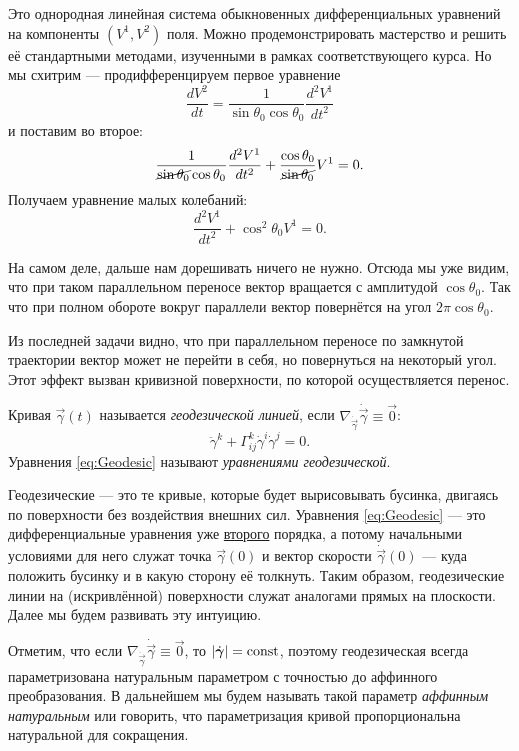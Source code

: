 \begin{solution}
	Это однородная линейная система обыкновенных дифференциальных уравнений на компоненты $(V^1, V^2)$ поля. Можно продемонстрировать мастерство и решить её стандартными методами, изученными в рамках соответствующего курса. Но мы схитрим --- продифференцируем первое уравнение
	\[
		\frac{dV^2}{dt} = \frac{1}{\sin\theta_0\cos\theta_0}\frac{d^2V^1}{dt^2}
	\]
	и поставим во второе:
	\[
		\frac{1}{\cancel{\sin\theta_0}\cos\theta_0}\frac{d^2V^1}{dt^2} + \frac{\cos\theta_0}{\cancel{\sin\theta_0}}V^1 = 0.
	\]
	Получаем уравнение малых колебаний:
	\[
		\frac{d^2V^1}{dt^2} + \cos^2\theta_0V^1 = 0.
	\]

	На самом деле, дальше нам дорешивать ничего не нужно. Отсюда мы уже видим, что при таком параллельном переносе вектор вращается с амплитудой $\cos\theta_0$. Так что при полном обороте вокруг параллели вектор повернётся на угол $2\pi\cos\theta_0$.
\end{solution}

Из последней задачи видно, что при параллельном переносе по замкнутой траектории вектор может не перейти в себя, но повернуться на некоторый угол. Этот эффект вызван кривизной поверхности, по которой осуществляется перенос.

\begin{definition}
	Кривая $\vec{\gamma}(t)$ называется \textit{геодезической линией}, если $\nabla_{\dot{\vec{\gamma}}}\dot{\vec{\gamma}} \equiv \vec{0}$:
	\begin{equation} \label{eq:Geodesic}
		\ddot{\gamma}^k + \Gamma_{ij}^k\dot{\gamma}^i\dot\gamma^j = 0.
	\end{equation}
	Уравнения \eqref{eq:Geodesic} называют \textit{уравнениями геодезической}.
\end{definition}

Геодезические --- это те кривые, которые будет вырисовывать бусинка, двигаясь по поверхности без воздействия внешних сил. Уравнения \eqref{eq:Geodesic} --- это дифференциальные уравнения уже \underline{второго} порядка, а потому начальными условиями для него служат точка $\vec{\gamma}(0)$ и вектор скорости $\dot{\vec{\gamma}}(0)$ --- куда положить бусинку и в какую сторону её толкнуть. Таким образом, геодезические линии на (искривлённой) поверхности служат аналогами прямых на плоскости. Далее мы будем развивать эту интуицию.

Отметим, что если $\nabla_{\dot{\vec{\gamma}}}\dot{\vec{\gamma}} \equiv \vec{0}$, то $\left\lvert\dot{\boldsymbol{\gamma}}\right\rvert = \mathrm{const}$, поэтому геодезическая всегда параметризована натуральным параметром с точностью до аффинного преобразования. В дальнейшем мы будем называть такой параметр \textit{аффинным натуральным} или говорить, что параметризация кривой пропорциональна натуральной для сокращения.


